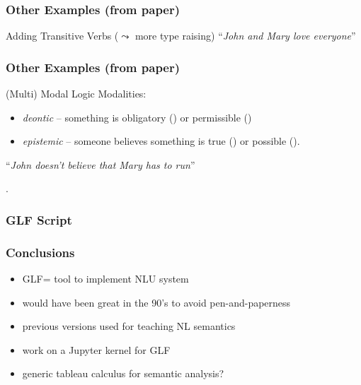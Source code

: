 \documentclass[dvipsnames]{beamer}
\def\GLF{\textsf{GLF}\xspace}
\def\str#1{``\textit{#1}''}   %
\begin{document}
\begin{frame}
    \frametitle{Other Examples (from paper)}
    \begin{block}{Adding Transitive Verbs ($\leadsto$ more type raising)}
        \str{John and Mary love everyone}

        \myarr{}

    \end{block}
\end{frame}

\begin{frame}
    \frametitle{Other Examples (from paper)}
    \vspace{2em}
    \begin{block}{(Multi) Modal Logic}
        Modalities:
        \begin{itemize}
            \item \emph{deontic} -- something is obligatory () or permissible ()
            \item \emph{epistemic} -- someone believes something is true () or possible ().
        \end{itemize}
        \vspace{1.5em}
        \str{John doesn't believe that Mary has to run}

        \myarr{}

        .
    \end{block}
\end{frame}

\begin{frame}[fragile]
    \frametitle{\GLF{} Script}

    
\end{frame}

\begin{frame}
    \frametitle{Conclusions}
    \begin{itemize}
        \item \GLF = tool to implement NLU system
        \item would have been great in the 90's to avoid pen-and-paperness
        \item previous versions used for teaching NL semantics
    \end{itemize}

    \vspace{2em}
    \begin{itemize}
        \item work on a Jupyter kernel for GLF
        \item generic tableau calculus for semantic analysis?
    \end{itemize}
\end{frame}
\end{document}
